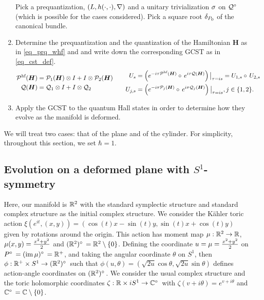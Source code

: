 \documentclass[notas.tex]{subfiles} 				%
\begin{document}
\begin{enumerate}
	Pick a prequantization, $(L, h(\cdot,\cdot), \nabla)$ and a unitary trivialization $\sigma$ on $\nfld^\circ$ (which is possible for the cases considered). Pick a square root $\delta_{P_0}$ of the canonical bundle. 
	\item \label{intro_operator_notation} Determine the prequantization and the quantization of the Hamiltonian $\bm{H}$ as in \eqref{eq_prq_whf} and  and write down the corresponding GCST as in \eqref{eq_cst_def}.
	\begin{align*}
	\begin{aligned}
		\prqhf{\bm{H}} &=  \prqs_1(\bm{H}) \otimes I +  I \otimes \prqs_2(\bm{H}) \\
		\q{\bm{H}} &=  \qs_1 \otimes I +  I \otimes \qs_2 
	\end{aligned}
	\qquad
	\begin{aligned}
		U_s &= \left ( e^{-i \tau \prqhf{\bm{H}}} \circ e^{i \tau \q{\bm{H}}} \right )\big|_{\tau = is} = U_{1,s} \circ U_{2,s} \\
		U_{j,s} &= \left ( e^{-i \tau \prqs_j(\bm{H})} \circ e^{i \tau \qs_j(\bm{H})} \right )\big|_{\tau = is}, j \in \{1,2\}.
	\end{aligned}
	\end{align*}
	\item Apply the GCST to the quantum Hall states in order to determine how they evolve as the manifold is deformed.
\end{enumerate}

We will treat two cases: that of the plane and of the cylinder. For simplicity, throughout this section, we set $\hbar = 1$. 

\subsection{Evolution on a deformed plane with $S^1$-symmetry} \label{sec_plane}
Here, our manifold is $\mathbb{R}^2$ with the standard symplectic structure and standard complex structure as the initial complex structure. We consider the Kähler toric action $\xi(e^{it}, (x, y)) = (\cos (t) x - \sin(t) y, \sin(t) x + \cos(t) y)$
given by rotations around the origin. This action has moment map $\mu: \mathbb{R}^2 \to \mathbb{R}$, $\mu(x, y) =  \frac{x^2 + y^2}{2}$ and $(\reals^2)^\circ = \reals^2 \setminus \{0\}$. Defining the coordinate $u = \mu = \frac{x^2 + y^2}{2}$ on $P^\circ = (\image \mu)^\circ = \reals^+$, and taking the angular coordinate $\theta$ on $S^1$, then $\phi: \reals^+ \times S^1 \to (\reals^2)^\circ$ such that $\phi(u, \theta) = \left (\sqrt{2u} \cos \theta, \sqrt{2u} \sin \theta \right )$ defines action-angle coordinates on $(\reals^2)^\circ$. We consider the usual complex structure and the toric holomorphic coordinates $\zeta: \reals \times i S^1 \to \cmplx^\circ$ with $\zeta(v + i\theta) = e^{v + i\theta}$ and $\cmplx^\circ = \cmplx \setminus \{0\}$.
\end{document}
